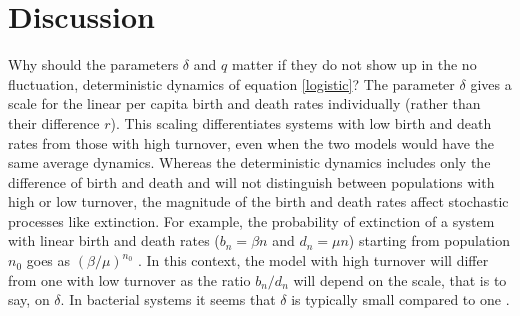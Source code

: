 

\section{Discussion}

Why should the parameters $\delta$ and $q$ matter if they do not show up in the no fluctuation, deterministic dynamics of equation \ref{logistic}? 
The parameter $\delta$ gives a scale for the linear per capita birth and death rates individually (rather than their difference $r$).
This scaling differentiates systems with low birth and death rates from those with high turnover, even when the two models would have the same average dynamics. 
Whereas the deterministic dynamics includes only the difference of birth and death and will not distinguish between populations with high or low turnover, the magnitude of the birth and death rates affect stochastic processes like extinction. 
For example, the probability of extinction of a system with linear birth and death rates ($b_n=\beta n$ and $d_n=\mu n$) starting from population $n_0$ goes as $(\beta/\mu)^{n_0}$ \cite{Nisbet1982}.
In this context, the model with high turnover will differ from one with low turnover as the ratio $b_n/d_n$ will depend on the scale, that is to say, on $\delta$. 
In bacterial systems it seems that $\delta$ is typically small compared to one \cite{Servais1985}. 


